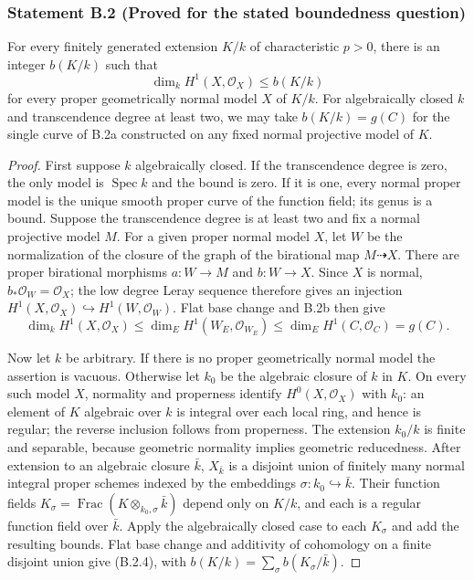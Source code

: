 \subsubsection*{Statement B.2 (Proved for the stated boundedness question)}
For every finitely generated extension $K/k$ of characteristic
$p>0$, there is an integer $b(K/k)$ such that
\[
 \dim_k H^1(X,\mathcal O_X)\leq b(K/k)
 \tag{B.2.4}
\]
for every proper geometrically normal model $X$ of $K/k$.
For algebraically closed $k$ and transcendence degree at least
two, we may take $b(K/k)=g(C)$ for the single curve of B.2a
constructed on any fixed normal projective model of $K$.
\begin{proof}
First suppose $k$ algebraically closed.  If the transcendence
degree is zero, the only model is $\operatorname{Spec}k$ and
the bound is zero.  If it is one, every normal proper model is
the unique smooth proper curve of the function field; its
genus is a bound.  Suppose the transcendence degree is at
least two and fix a normal projective model $M$.
For a given proper normal model $X$, let $W$ be the normalization
of the closure of the graph of the birational map $M\dashrightarrow X$.
There are proper birational morphisms $a:W\to M$ and $b:W\to X$.
Since $X$ is normal, $b_*\mathcal O_W=\mathcal O_X$; the
low degree Leray sequence therefore gives an injection
$H^1(X,\mathcal O_X)\hookrightarrow H^1(W,\mathcal O_W)$.
Flat base change and B.2b then give
\[
 \dim_k H^1(X,\mathcal O_X)
 \leq\dim_E H^1(W_E,\mathcal O_{W_E})
 \leq\dim_E H^1(C,\mathcal O_C)=g(C).
\]

Now let $k$ be arbitrary.  If there is no proper geometrically
normal model the assertion is vacuous.  Otherwise let $k_0$
be the algebraic closure of $k$ in $K$.  On every such model
$X$, normality and properness identify
$H^0(X,\mathcal O_X)$ with $k_0$: an element of $K$ algebraic
over $k$ is integral over each local ring, and hence is regular;
the reverse inclusion follows from properness.  The extension
$k_0/k$ is finite and separable, because geometric normality
implies geometric reducedness.  After extension to an algebraic
closure $\bar k$, $X_{\bar k}$ is a disjoint union of finitely
many normal integral proper schemes indexed by the embeddings
$\sigma:k_0\hookrightarrow\bar k$.  Their function fields
$K_\sigma=\operatorname{Frac}(K\otimes_{k_0,\sigma}\bar k)$
depend only on $K/k$, and each is a regular function field
over $\bar k$.  Apply the algebraically closed case to each
$K_\sigma$ and add the resulting bounds.  Flat base change
and additivity of cohomology on a finite disjoint union give
(B.2.4), with
$b(K/k)=\sum_\sigma b(K_\sigma/\bar k)$.
\end{proof}

